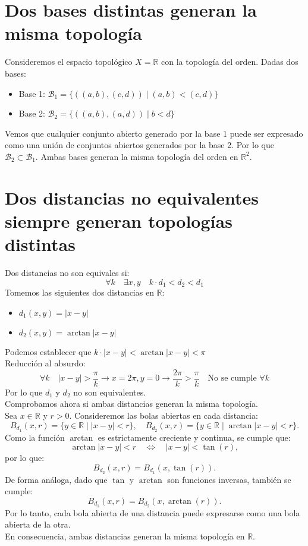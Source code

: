 \documentclass[12pt]{article}
\begin{document}
\section*{Dos bases distintas generan la misma topología}
Consideremos el espacio topológico \( X = \mathbb{R} \) con la topología del orden.
Dadas dos bases:
\begin{itemize}
    \item Base 1: \(\mathcal{B}_1 = \{((a,b), (c,d)) \mid (a,b) < (c,d)\}\)
    \item Base 2: \(\mathcal{B}_2 = \{((a,b), (a,d)) \mid b < d\}\)
\end{itemize}
Vemos que cualquier conjunto abierto generado por la base 1 puede ser expresado como una unión de conjuntos abiertos generados por la base 2. Por lo que \(\mathcal{B}_2 \subset \mathcal{B}_1\). Ambas bases generan la misma topología del orden en \( \mathbb{R}^2 \).
\section*{Dos distancias no equivalentes siempre generan topologías distintas}
Dos distancias no son equivales si:
\[
\forall k \quad \exists x,y \quad k \cdot d_1 < d_2 < d_1
\]
Tomemos las siguientes dos distancias en \( \mathbb{R}\):
\begin{itemize}
    \item \( d_1(x,y) = |x-y| \)
    \item \( d_2(x,y) = \arctan|x - y| \)
\end{itemize}
Podemos establecer que \(k \cdot |x-y| < \arctan|x - y| < \pi\) \\
Reducción al absurdo: 
\[
\forall k \quad |x-y| > \frac{\pi}{k} \rightarrow{x=2\pi, y=0} \rightarrow \frac{2\pi}{k} > \frac{\pi}{k} \quad \text{No se cumple } \forall k
\]
Por lo que \(d_1\) y \(d_2\) no son equivalentes. \\
Comprobamos ahora si ambas distancias generan la misma topología. \\
Sea \(x \in \mathbb{R}\) y \(r > 0\). Consideremos las bolas abiertas en cada distancia:
\[
B_{d_1}(x, r) = \{ y \in \mathbb{R} \mid |x - y| < r \}, \quad 
B_{d_2}(x, r) = \{ y \in \mathbb{R} \mid \arctan|x - y| < r \}.
\]
Como la función \(\arctan\) es estrictamente creciente y continua, se cumple que:
\[
\arctan|x - y| < r \quad \Leftrightarrow \quad |x - y| < \tan(r),
\]
por lo que:
\[
B_{d_2}(x, r) = B_{d_1}(x, \tan(r)).
\]
De forma análoga, dado que \(\tan\) y \(\arctan\) son funciones inversas, también se cumple:
\[
B_{d_1}(x, r) = B_{d_2}(x, \arctan(r)).
\]
Por lo tanto, cada bola abierta de una distancia puede expresarse como una bola abierta de la otra. \\
En consecuencia, ambas distancias generan la misma topología en \(\mathbb{R}\).
\end{document}
